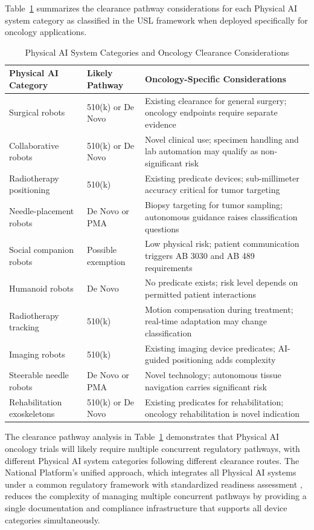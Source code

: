 Table~\ref{tab:clearance-oncology} summarizes the clearance pathway
considerations for each Physical AI system category as classified in the
USL framework \cite{usl-standard} when deployed specifically for oncology
applications.

\begin{table}[H]
\centering
\caption{Physical AI System Categories and Oncology Clearance Considerations}
\label{tab:clearance-oncology}
\small
\begin{tabularx}{\textwidth}{l l X}
\toprule
\textbf{Physical AI Category} & \textbf{Likely Pathway} & \textbf{Oncology-Specific Considerations} \\
\midrule
Surgical robots & 510(k) or De Novo & Existing clearance for general surgery; oncology endpoints require separate evidence \\
Collaborative robots & 510(k) or De Novo & Novel clinical use; specimen handling and lab automation may qualify as non-significant risk \\
Radiotherapy positioning & 510(k) & Existing predicate devices; sub-millimeter accuracy critical for tumor targeting \\
Needle-placement robots & De Novo or PMA & Biopsy targeting for tumor sampling; autonomous guidance raises classification questions \\
Social companion robots & Possible exemption & Low physical risk; patient communication triggers AB 3030 and AB 489 requirements \\
Humanoid robots & De Novo & No predicate exists; risk level depends on permitted patient interactions \\
Radiotherapy tracking & 510(k) & Motion compensation during treatment; real-time adaptation may change classification \\
Imaging robots & 510(k) & Existing imaging device predicates; AI-guided positioning adds complexity \\
Steerable needle robots & De Novo or PMA & Novel technology; autonomous tissue navigation carries significant risk \\
Rehabilitation exoskeletons & 510(k) or De Novo & Existing predicates for rehabilitation; oncology rehabilitation is novel indication \\
\bottomrule
\end{tabularx}
\end{table}

The clearance pathway analysis in Table~\ref{tab:clearance-oncology}
demonstrates that Physical AI oncology trials will likely require multiple
concurrent regulatory pathways, with different Physical AI system categories
following different clearance routes. The National Platform's unified
approach, which integrates all Physical AI systems under a common regulatory
framework \cite{ich-adapt, cfr50-adapt, cfr312-adapt} with standardized
readiness assessment \cite{usl-standard}, reduces the complexity of managing
multiple concurrent pathways by providing a single documentation and
compliance infrastructure that supports all device categories simultaneously.


